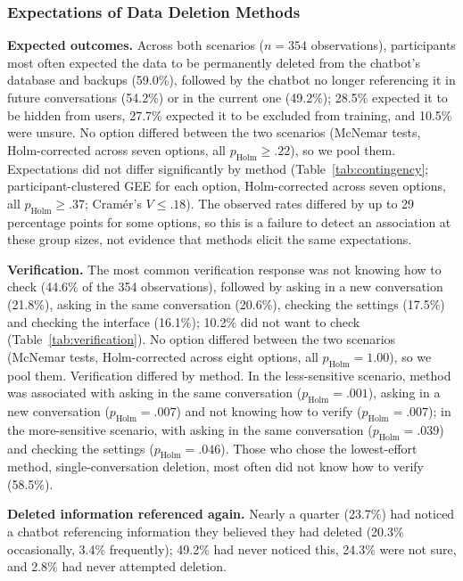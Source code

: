 \documentclass[conference,compsoc]{IEEEtran}
\begin{document}
\subsubsection{Expectations of Data Deletion Methods}
\label{sec:expectations}

\textbf{Expected outcomes.} Across both scenarios ($n=354$ observations), participants most often expected the data to be permanently deleted from the chatbot's database and backups (59.0\%), followed by the chatbot no longer referencing it in future conversations (54.2\%) or in the current one (49.2\%); 28.5\% expected it to be hidden from users, 27.7\% expected it to be excluded from training, and 10.5\% were unsure. No option differed between the two scenarios (McNemar tests, Holm-corrected
across seven options, all $p_{\mathrm{Holm}}\geq.22$), so we pool them.
Expectations did not differ significantly by method (Table~\ref{tab:contingency}; participant-clustered GEE for each option, Holm-corrected across seven options, all $p_{\mathrm{Holm}}\geq.37$; Cram\'er's $V\leq.18$). The observed rates differed by up to 29 percentage points for some options, so this is a failure to detect an association at these group sizes, not evidence that methods elicit the same expectations.

\textbf{Verification.} The most common verification response was not knowing how to check (44.6\% of the 354 observations), followed by asking in a new conversation (21.8\%), asking in the same conversation (20.6\%), checking the settings (17.5\%) and checking the interface (16.1\%); 10.2\% did not want to check (Table~\ref{tab:verification}). No option differed
between the two scenarios (McNemar tests, Holm-corrected across eight options,
all $p_{\mathrm{Holm}}=1.00$), so we pool them. Verification differed by method. In the less-sensitive scenario, method was associated with asking in the same conversation ($p_{\mathrm{Holm}}=.001$), asking in a new conversation ($p_{\mathrm{Holm}}=.007$) and not knowing how to verify ($p_{\mathrm{Holm}}=.007$); in the more-sensitive scenario, with asking in the same conversation ($p_{\mathrm{Holm}}=.039$) and checking the settings ($p_{\mathrm{Holm}}=.046$). Those who chose the lowest-effort method, single-conversation deletion, most often did not know how to verify (58.5\%).

\textbf{Deleted information referenced again.} Nearly a quarter (23.7\%) had noticed a chatbot referencing information they believed they had deleted (20.3\% occasionally, 3.4\% frequently); 49.2\% had never noticed this, 24.3\% were not sure, and 2.8\% had never attempted deletion.
\end{document}
